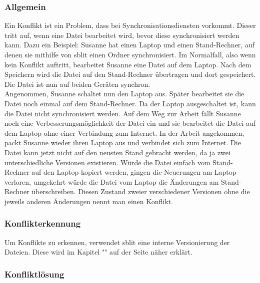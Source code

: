\subsubsection{Allgemein}
Ein Konflikt ist ein Problem, dass bei Synchronisationsdiensten vorkommt. Dieser tritt auf, wenn eine Datei bearbeitet wird, bevor diese synchronisiert werden kann. Dazu ein Beispiel: Susanne hat einen Laptop und einen Stand-Rechner, auf denen sie mithilfe von sblit einen Ordner synchronisiert. Im Normalfall, also wenn kein Konflikt auftritt, bearbeitet Susanne eine Datei auf dem Laptop. Nach dem Speichern wird die Datei auf den Stand-Rechner übertragen und dort gespeichert. Die Datei ist nun auf beiden Geräten synchron.\\
Angenommen, Susanne schaltet nun den Laptop aus. Später bearbeitet sie die Datei noch einmal auf dem Stand-Rechner. Da der Laptop ausgeschaltet ist, kann die Datei nicht synchronisiert werden. Auf dem Weg zur Arbeit fällt Susanne noch eine Verbesserungsmöglichkeit der Datei ein und sie bearbeitet die Datei auf dem Laptop ohne einer Verbindung zum Internet. In der Arbeit angekommen, packt Susanne wieder ihren Laptop aus und verbindet sich zum Internet. Die Datei kann jetzt nicht auf den neusten Stand gebracht werden, da ja zwei unterschiedliche Versionen existieren. Würde die Datei einfach vom Stand-Rechner auf den Laptop kopiert werden, gingen die Neuerungen am Laptop verloren, umgekehrt würde die Datei vom Laptop die Änderungen am Stand-Rechner überschreiben. Diesen Zustand zweier verschiedener Versionen ohne die jeweils anderen Änderungen nennt man einen Konflikt.

\subsubsection{Konflikterkennung}\label{Konflikterkennung}
Um Konflikte zu erkennen, verwendet sblit eine interne Versionierung der Dateien. Diese wird im Kapitel "" auf der Seite \pageref{Logfile} näher erklärt.

\subsubsection{Konfliktlösung}
